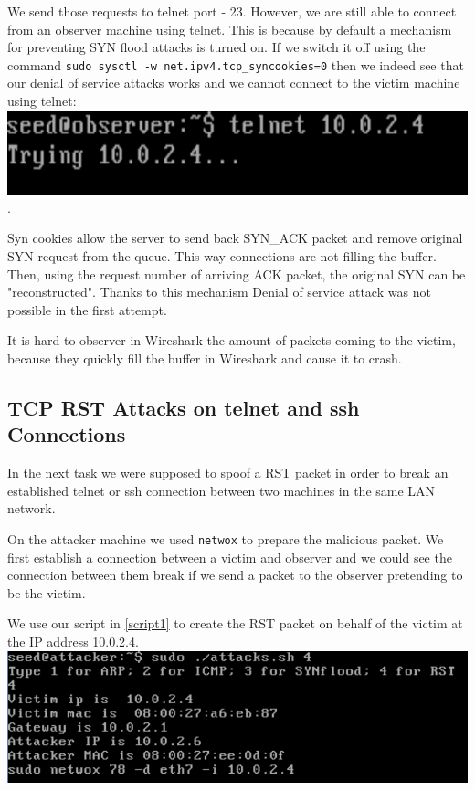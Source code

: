 \documentclass[12pt, a4paper, pdflatex]{article}
\begin{document}
We send those requests to telnet port - 23. However, we are still able to connect from an observer machine using telnet. This is because by default a mechanism for preventing SYN flood attacks is turned on. If we switch it off using the command \texttt{sudo sysctl -w net.ipv4.tcp\_syncookies=0} then we indeed see that our denial of service attacks works and we cannot connect to the victim machine using telnet:\\
\includegraphics[width=.95\textwidth]{gfx/syn-telnet.png}.

Syn cookies allow the server to send back SYN\_ACK packet and remove original SYN request from the queue. This way connections are not filling the buffer. Then, using the request number of arriving ACK packet, the original SYN can be "reconstructed". Thanks to this mechanism Denial of service attack was not possible in the first attempt.

It is hard to observer in Wireshark the amount of packets coming to the victim, because they quickly fill the buffer in Wireshark and cause it to crash.

\subsection{TCP RST Attacks on telnet and ssh Connections}

In the next task we were supposed to spoof a RST packet in order to break an established telnet or ssh connection between two machines in the same LAN network.

On the attacker machine we used \texttt{netwox} to prepare the malicious packet. We first establish a connection between a victim and observer and we could see the connection between them break if we send a packet to the observer pretending to be the victim.

We use our script in \ref{script1} to create the RST packet on behalf of the victim at the IP address 10.0.2.4.\\
\includegraphics[width=.95\textwidth]{gfx/rst-attack.png}
\end{document}
